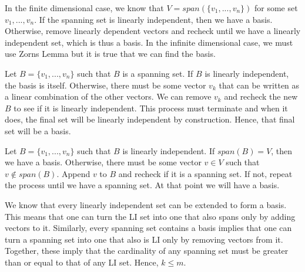 \documentclass{report}
\begin{document}

\begin{myproof}
    In the finite dimensional case, we know that $V = span(\{v_1, ..., v_n\})$ for some set $v_1,..., v_n$. If the spanning set is linearly independent, then we have a basis. Otherwise, remove linearly dependent vectors and recheck until we have a linearly independent set, which is thus a basis. In the infinite dimensional case, we must use Zorns Lemma but it is true that we can find the basis.
\end{myproof}

\begin{myproof}
    Let $B = \{v_1, ..., v_n\}$ such that $B$ is a spanning set. If $B$ is linearly independent, the basis is itself. Otherwise, there must be some vector $v_k$ that can be written as a linear combination of the other vectors. We can remove $v_k$ and recheck the new $B$ to see if it is linearly independent. This process must terminate and when it does, the final set will be linearly independent by construction. Hence, that final set will be a basis.
\end{myproof}

\begin{myproof}
    Let $B = \{v_1, ..., v_n\}$ such that $B$ is linearly independent. If $span(B) = V$, then we have a basis. Otherwise, there must be some vector $v \in V$ such that $v \not\in span(B)$. Append $v$ to $B$ and recheck if it is a spanning set. If not, repeat the process until we have a spanning set. At that point we will have a basis.
\end{myproof}

\begin{myproof}
    We know that every linearly independent set can be extended to form a basis. This means that one can turn the LI set into one that also spans only by adding vectors to it. Similarly, every spanning set contains a basis implies that one can turn a spanning set into one that also is LI only by removing vectors from it. Together, these imply that the cardinality of any spanning set must be greater than or equal to that of any LI set. Hence, $k \leq m$.
\end{myproof}
\end{document}
